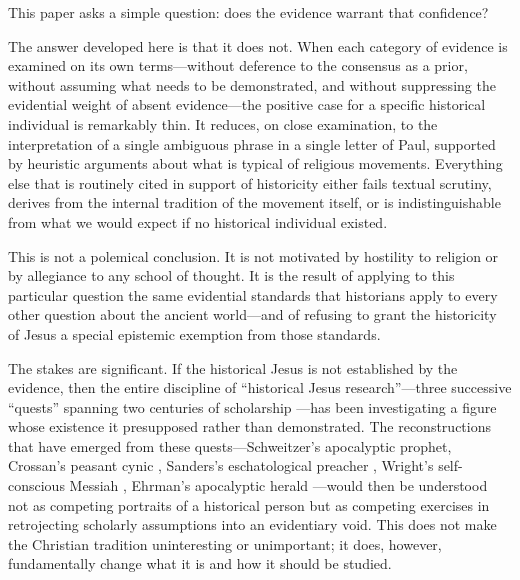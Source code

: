 \documentclass[12pt,oneside]{article}
\begin{document}
This paper asks a simple question: does the evidence warrant that
confidence?

The answer developed here is that it does not.  When each category of
evidence is examined on its own terms---without deference to the
consensus as a prior, without assuming what needs to be demonstrated, and
without suppressing the evidential weight of absent evidence---the
positive case for a specific historical individual is remarkably thin.
It reduces, on close examination, to the interpretation of a single
ambiguous phrase in a single letter of Paul, supported by heuristic
arguments about what is typical of religious movements.  Everything else
that is routinely cited in support of historicity either fails textual
scrutiny, derives from the internal tradition of the movement itself, or
is indistinguishable from what we would expect if no historical
individual existed.

This is not a polemical conclusion.  It is not motivated by hostility to
religion or by allegiance to any school of thought.  It is the result of
applying to this particular question the same evidential standards that
historians apply to every other question about the ancient world---and
of refusing to grant the historicity of Jesus a special epistemic
exemption from those standards.

The stakes are significant.  If the historical Jesus is not established
by the evidence, then the entire discipline of ``historical Jesus
research''---three successive ``quests'' spanning two centuries of
scholarship \citep{Schweitzer1906,Kasemann1954,Wright1996}---has been
investigating a figure whose existence it presupposed rather than
demonstrated.  The reconstructions that have emerged from these
quests---Schweitzer's apocalyptic prophet, Crossan's peasant cynic
\citep{Crossan1991}, Sanders's eschatological preacher
\citep{Sanders1985}, Wright's self-conscious Messiah
\citep{Wright1996}, Ehrman's apocalyptic herald
\citep{Ehrman1999}---would then be understood not as competing portraits
of a historical person but as competing exercises in retrojecting
scholarly assumptions into an evidentiary void.  This does not make the
Christian tradition uninteresting or unimportant; it does, however,
fundamentally change what it is and how it should be studied.
\end{document}

